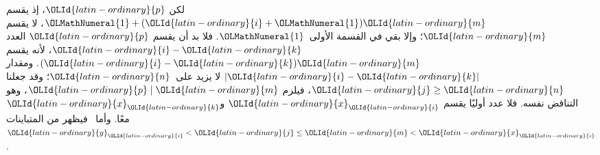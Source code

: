 \documentclass[../../../include/open-logic-section]{subfiles}
\begin{document}
لكن $\OLId{latin-ordinary}{p}$، إذ يقسم $\OLMathNumeral{1}+(\OLId{latin-ordinary}{i}+\OLMathNumeral{1})\OLId{latin-ordinary}{m}$، لا يقسم $\OLId{latin-ordinary}{m}$؛ وإلا بقي في القسمة
الأولى~$\OLMathNumeral{1}$. فلا بد أن يقسم $\OLId{latin-ordinary}{p}$ العدد $\OLId{latin-ordinary}{i}-\OLId{latin-ordinary}{k}$، لأنه يقسم
$(\OLId{latin-ordinary}{i}-\OLId{latin-ordinary}{k})\OLId{latin-ordinary}{m}$. ومقدار $\left|\OLId{latin-ordinary}{i}-\OLId{latin-ordinary}{k}\right|$ لا يزيد على~$\OLId{latin-ordinary}{n}$؛ وقد جعلنا
$\OLId{latin-ordinary}{j}\geq \OLId{latin-ordinary}{n}$، فيلزم $\OLId{latin-ordinary}{p}\mid \OLId{latin-ordinary}{m}$، وهو التناقض نفسه.
فلا عدد أوليًا يقسم $\OLId{latin-ordinary}{x}_\OLId{latin-ordinary}{i}$ و$\OLId{latin-ordinary}{x}_\OLId{latin-ordinary}{k}$ معًا.
وأما~ فيظهر من المتباينات $\OLId{latin-ordinary}{y}_\OLId{latin-ordinary}{i}<\OLId{latin-ordinary}{j}\leq \OLId{latin-ordinary}{m}<\OLId{latin-ordinary}{x}_\OLId{latin-ordinary}{i}$.
\end{document}
